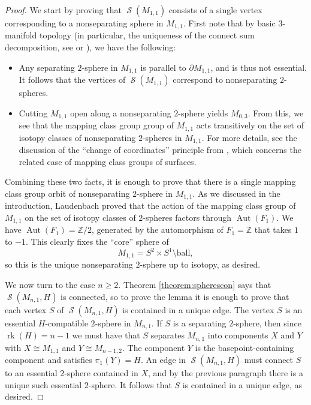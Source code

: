\documentclass[11pt]{amsart}
\numberwithin{equation}{section}
\theoremstyle{plain}
\theoremstyle{definition}
\theoremstyle{remark}
\newcommand\Z{\ensuremath{\mathbb{Z}}}
\DeclareMathOperator{\rank}{rk}
\DeclareMathOperator{\Aut}{Aut}
\DeclareMathOperator{\Spheres}{\mathcal{S}}
\begin{document}
\begin{proof}
We start by proving that $\Spheres(M_{1,1})$ consists of a single vertex corresponding to 
a nonseparating sphere in $M_{1,1}$.  First note that by basic $3$-manifold topology (in particular,
the uniqueness of the connect sum decomposition, see \cite{MilnorConnectSum} or \cite[\S 3]{Hempel}), we have the
following:
\begin{itemize}
\item Any separating $2$-sphere in $M_{1,1}$ is parallel to $\partial M_{1,1}$, and is thus
not essential.  It follows that the vertices of $\Spheres(M_{1,1})$ correspond to nonseparating
$2$-spheres.
\item Cutting $M_{1,1}$ open along a nonseparating $2$-sphere yields $M_{0,3}$.  From this, we see that the mapping class group
group of $M_{1,1}$ acts transitively on the set of isotopy classes of nonseparating
$2$-spheres in $M_{1,1}$.  For more details, see the discussion of the ``change of coordinates'' principle from \cite[\S 1.3]{FarbMargalitPrimer}, which concerns
the related case of mapping class groups of surfaces.  
\end{itemize}
Combining these two facts, it is enough to prove that there is a single mapping class group
orbit of nonseparating $2$-sphere in $M_{1,1}$.
As we discussed in the introduction,
Laudenbach \cite{LaudenbachPaper, LaudenbachBook} proved that
the action of the mapping class group of $M_{1,1}$ on the set of isotopy classes of $2$-spheres
factors through $\Aut(F_1)$.
We have $\Aut(F_1) = \Z/2$, generated by the automorphism of $F_1 = \Z$ that takes
$1$ to $-1$.  This clearly fixes the ``core'' sphere of
\[M_{1,1} = S^2 \times S^1 \setminus \text{ball},\]
so this is the unique nonseparating $2$-sphere up to isotopy, as desired.

We now turn to the case $n \geq 2$.  Theorem \ref{theorem:spherescon} says that $\Spheres(M_{n,1},H)$ is connected,
so to prove the lemma it is enough to prove that each vertex $S$ of $\Spheres(M_{n,1},H)$ is contained
in a unique edge.  The vertex $S$ is an essential $H$-compatible $2$-sphere in $M_{n,1}$.  If $S$
is a separating $2$-sphere, then since $\rank(H) = n-1$ we must have that $S$ separates
$M_{n,1}$ into components $X$ and $Y$ with $X \cong M_{1,1}$ and $Y \cong M_{n-1,2}$.  The
component $Y$ is the basepoint-containing component and satisfies $\pi_1(Y) = H$.  An edge
in $\Spheres(M_{n,1},H)$ must connect $S$ to an essential $2$-sphere contained in
$X$, and by the previous paragraph there is a unique such essential $2$-sphere.  It follows that
$S$ is contained in a unique edge, as desired.


\end{proof}
\end{document}
